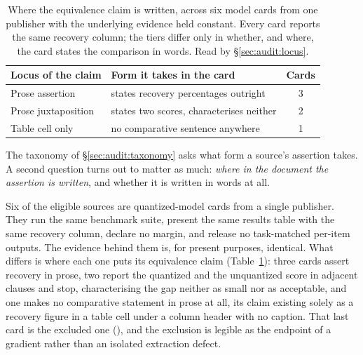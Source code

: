 \begin{table}[!t]
\centering
\caption{Where the equivalence claim is written, across six model cards from one
publisher with the underlying evidence held constant. Every card reports the
same recovery column; the tiers differ only in whether, and where, the card
states the comparison in words. Read by \S\ref{sec:audit:locus}.}
\label{tab:audit-locus}
\begin{tabular}{llc}
\toprule
Locus of the claim & Form it takes in the card & Cards \\
\midrule
Prose assertion      & states recovery percentages outright & 3 \\
Prose juxtaposition  & states two scores, characterises neither & 2 \\
Table cell only      & no comparative sentence anywhere & 1 \\
\bottomrule
\end{tabular}
\end{table}

The taxonomy of \S\ref{sec:audit:taxonomy} asks what form a source's assertion
takes. A second question turns out to matter as much: \emph{where in the
document the assertion is written}, and whether it is written in words at all.

Six of the eligible sources are quantized-model cards from a single publisher.
They run the same benchmark suite, present the same results table with the same
recovery column, declare no margin, and release no task-matched per-item
outputs. The evidence behind them is, for present purposes, identical. What
differs is where each one puts its equivalence claim
(Table~\ref{tab:audit-locus}): three cards assert recovery in prose, two report
the quantized and the unquantized score in adjacent clauses and stop,
characterising the gap neither as small nor as acceptable, and one makes no
comparative statement in prose at all, its claim existing solely as a recovery
figure in a table cell under a column header with no caption. That last card is
the excluded one (\AuditIneligibleClaim{}), and the exclusion is legible as the
endpoint of a gradient rather than an isolated extraction defect.

